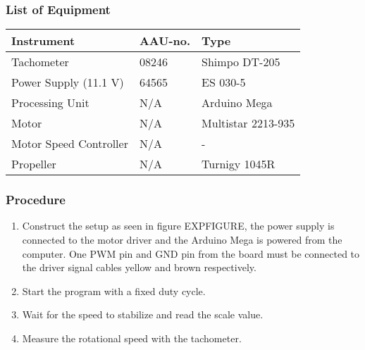 \subsubsection{List of Equipment}
\begin{table}[H]
	\begin{tabular}{|l|l|p{4.3cm}|}
		\hline%
		\textbf{Instrument}                                  &  \textbf{AAU-no.}  &  \textbf{Type}                       \\
		\hline%
		Tachometer                                           &  08246           &  Shimpo DT-205		                   \\
		\hline%
	    Power Supply (11.1 V) &  64565                   &  ES 030-5                 \\
		\hline%
		Processing Unit                                   &  N/A               & Arduino Mega     \\
		\hline%
		Motor                                   &  N/A               & Multistar 2213-935     \\
		\hline%
		Motor Speed Controller                                   &  N/A               &  -      \\
		\hline%
		Propeller                                   &  N/A               & Turnigy 1045R     \\
		\hline%
		
	\end{tabular}
\end{table}

\subsubsection{Procedure}
\begin{enumerate}
	\item Construct the setup as seen in figure EXPFIGURE, the power supply is connected to the motor driver and the Arduino Mega is powered from the computer. One PWM pin and GND pin from the board must be connected to the driver signal cables yellow and brown respectively. 
	\item Start the program with a fixed duty cycle.
	\item Wait for the speed to stabilize and read the scale value.
	\item Measure the rotational speed with the tachometer.
\end{enumerate}


